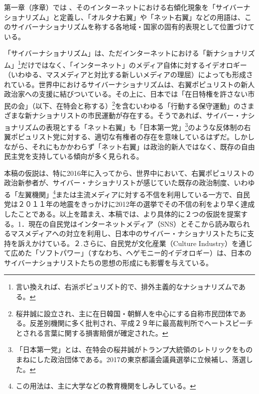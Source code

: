 \documentclass[10pt,british,A4paper,twoside]{memoir}
\begin{document}
第一章（序章）では
、そのインターネットにおける右傾化現象を「サイバーナショナリズム」と定義し、「オルタナ右翼」や「ネット右翼」などの用語は、このサイバーナショナリズムを称する各地域・国家の固有的表現として位置づけている。

「サイバーナショナリズム」は、ただインターネットにおける「新ナショナリズム」\footnote{言い換えれば、右派ポピュリズト的で、排外主義的なナショナリズムである。}だけではなく、「インターネット」のメディア自体に対するイデオロギー（いわゆる、マスメディアと対比する新しいメディアの理屈）によっても形成されている。世界中におけるサイバーナショナリズムは、右翼ポピュリストの新人政治家への支援に結びついている。その上に、日本では「在日特権を許さない市民の会」（以下、在特会と称する）\footnote{桜井誠に設立され、主に在日韓国・朝鮮人を中心にする自称市民団体である。反差別機関に多く批判され、平成２９年に最高裁判所でヘートスピーチとされる言葉に関する損害賠償が確定された。}を含むいわゆる「行動する保守運動」のさまざまな新ナショナリストの市民運動が存在する。そうであれば、サイバー・ナショナリズムの表現とする「ネット右翼」も「日本第一党」\footnote{「日本第一党」とは、在特会の桜井誠がトランプ大統領のレトリックをものまねにした政治団体である。2017の東京都議会議員選挙に立候補し、落選した。}のような反体制の右翼ポピュリスト党に対する、適切な有権者の存在を意味しているはずだ。しかしながら、それにもかかわらず「ネット右翼」は政治的新人ではなく、既存の自由民主党を支持している傾向が多く見られる。

本稿の仮説は、特に2016年に入ってから、世界中において、右翼ポピュリストの政治新参者が、サイバー・ナショナリストが感じていた既存の政治制度、いわゆる「左翼機関」\footnote{この用法は、主に大学などの教育機関をしみしている。}または主流メディアに対する不信を利用している一方で、自民党は２０１１年の地震をきっかけに2012年の選挙でその不信の利をより早く達成したことである。以上を踏まえ、本稿では、より具体的に２つの仮説を提案する。1．現在の自民党はインターネットメディア（SNS）とそこから読み取られるマスメディアへの対立を利用し、日本中のサイバー・ナショナリストたちに支持を訴えかけている。２.さらに、自民党が文化産業（Culture
Industry）を通じて広めた「ソフトパワー」（すなわち、ヘゲモニー的イデオロギー）は、日本のサイバーナショナリストたちの思想の形成にも影響を与えている。
\end{document}
